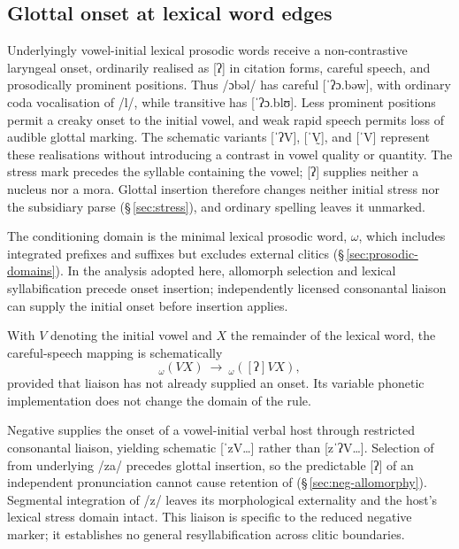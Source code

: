 \subsection{Glottal onset at lexical word edges}\label{sec:glottal-onset}

Underlyingly vowel-initial lexical prosodic words receive a non-contrastive
laryngeal onset, ordinarily realised as [ʔ] in citation forms, careful
speech, and prosodically prominent positions. Thus  /ɔbəl/
 has careful [ˈʔɔ.bəw], with ordinary coda vocalisation of
/l/, while transitive  has [ˈʔɔ.blʊ]. Less prominent positions
permit a creaky onset to the initial vowel, and weak rapid speech permits
loss of audible glottal marking. The schematic variants [ˈʔV], [ˈV̰],
and [ˈV] represent these realisations without introducing a contrast in
vowel quality or quantity. The stress mark precedes the syllable containing
the vowel; [ʔ] supplies neither a nucleus nor a mora. Glottal insertion
therefore changes neither initial stress nor the subsidiary parse
(§\,\ref{sec:stress}), and ordinary spelling leaves it unmarked.

The conditioning domain is the minimal lexical prosodic word, $\omega$,
which includes integrated prefixes and suffixes but excludes external
clitics (§\,\ref{sec:prosodic-domains}). In the analysis adopted here,
allomorph selection and lexical syllabification precede onset insertion;
independently licensed consonantal liaison can supply the initial onset
before insertion applies.

\begin{samepage}
With $V$ denoting the initial vowel and $X$ the remainder of the lexical word, the careful-speech mapping is schematically
\[
  {}_{\omega}(VX)\ \longrightarrow\ {}_{\omega}([\text{ʔ}]VX),
\]
provided that liaison has not already supplied an onset. Its variable
phonetic implementation does not change the domain of the rule.
\end{samepage}

Negative  supplies the onset
of a vowel-initial verbal host through restricted consonantal liaison,
yielding schematic [ˈzV\ldots] rather than [zˈʔV\ldots]. Selection of
 from underlying /za/ precedes glottal insertion, so the
predictable [ʔ] of an independent pronunciation cannot cause retention of
 (§\,\ref{sec:neg-allomorphy}). Segmental integration of /z/
leaves its morphological externality and the host's lexical stress domain
intact. This liaison is specific to the reduced negative marker; it
establishes no general resyllabification across clitic boundaries.


